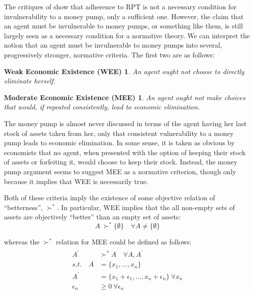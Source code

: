 \documentclass[11pt,a4paper]{article}
\newcommand\OB{\ensuremath{\succ^{\!*}}}  %
\begin{document}
\addtocounter{footnote}{-1}

The critiques of \textcite{Cubitt2001} show that adherence to RPT is not a necessary condition for invulnerability to a money pump, only a sufficient one.
However, the claim that an agent must be invulnerable to money pumps, or something like them, is still largely seen as a necessary condition for a normative theory.
We can interpret the notion that an agent must be invulnerable to money pumps into several, progressively stronger, normative criteria.
The first two are as follows:

\newtheorem*{WEE}{Weak Economic Existence (WEE)}
\newtheorem*{MEE}{Moderate Economic Existence (MEE)}
\begin{WEE}
	\label{th:WEE}
	An agent ought not choose to directly eliminate herself.
\end{WEE}
\begin{MEE}
	\label{th:MEE}
	An agent ought not make choices that would, if repeated consistently, lead to economic elimination.
\end{MEE}

The money pump is almost never discussed in terms of the agent having her last stock of assets taken from her, only that consistent vulnerability to a money pump leads to economic elimination.
In some sense, it is taken as obvious by economists that no agent, when presented with the option of keeping their stock of assets or forfeiting it, would choose to keep their stock.
Instead, the money pump argument seems to suggest MEE as a normative criterion, though only because it implies that WEE is necessarily true.

Both of these criteria imply the existence of some objective relation of \enquote{betterness}, {\OB}.
In particular, WEE implies that the all non-empty sets of assets are objectively \enquote{better} than an empty set of assets:
\begin{equation}
	\label{eq:WEE}
	A\ {\OB} \{\emptyset\} \quad \forall A \neq \{\emptyset\}
\end{equation}

\noindent whereas the {\OB} relation for MEE could be defined as follows:
\begin{align}
	\label{eq:MEE}
	\begin{split}
		A^\prime\ &{\OB} A \quad\forall A, A^\prime\\
		\mathit{s.t.}\quad A &= \{x_1,\ldots,x_n\}\\
		A^\prime &= \{x_1 + \epsilon_1,\ldots,x_n+\epsilon_n\} \ \forall x_n \\
		\epsilon_n &\geq 0 \ \forall \epsilon_n
	\end{split}
\end{align}
\end{document}
